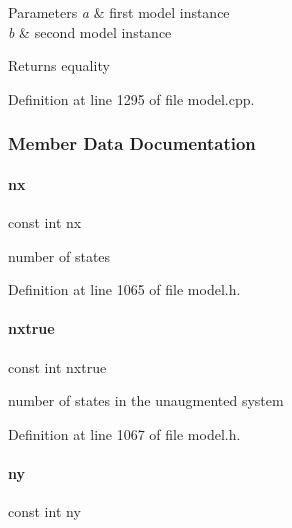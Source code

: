 \begin{DoxyParams}{Parameters}
{\em a} & first model instance \\
\hline
{\em b} & second model instance \\
\hline
\end{DoxyParams}
\begin{DoxyReturn}{Returns}
equality 
\end{DoxyReturn}


Definition at line 1295 of file model.\+cpp.



\subsubsection{Member Data Documentation}
\mbox{\label{classamici_1_1_model_a4f88110916f09b2adef33396203ff015}} 
\paragraph{\texorpdfstring{nx}{nx}}
{\footnotesize\ttfamily const int nx}

number of states 

Definition at line 1065 of file model.\+h.

\mbox{\label{classamici_1_1_model_acf5766cc8560edbdcec5b8ef79459239}} 
\paragraph{\texorpdfstring{nxtrue}{nxtrue}}
{\footnotesize\ttfamily const int nxtrue}

number of states in the unaugmented system 

Definition at line 1067 of file model.\+h.

\mbox{\label{classamici_1_1_model_a811734e12750524808dba01c57e92c66}} 
\paragraph{\texorpdfstring{ny}{ny}}
{\footnotesize\ttfamily const int ny}

